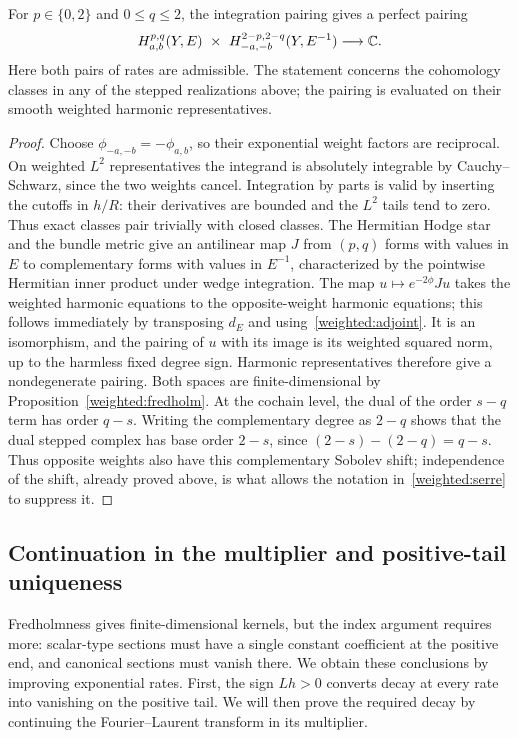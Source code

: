 \begin{lemma}\label{weighted:duality}
For $p\in\{0,2\}$ and $0\leq q\leq2$, the integration pairing gives
a perfect pairing
\begin{equation}\label{weighted:serre}
 H^{p,q}_{a,b}(Y,E)\ \times\
 H^{2-p,2-q}_{-a,-b}(Y,E^{-1})\longrightarrow\mathbb C.
\end{equation}
Here both pairs of rates are admissible. The statement concerns the
cohomology classes in any of the stepped realizations above; the pairing
is evaluated on their smooth weighted harmonic representatives.
\end{lemma}

\begin{proof}
Choose $\phi_{-a,-b}=-\phi_{a,b}$, so their exponential weight factors
are reciprocal. On weighted $L^2$
representatives the integrand is absolutely
integrable by Cauchy--Schwarz, since the two weights cancel. Integration
by parts is valid by inserting the cutoffs in $h/R$: their derivatives
are bounded and the $L^2$ tails tend to zero. Thus exact classes pair
trivially with closed classes. The Hermitian Hodge star and the bundle
metric give an antilinear map $J$ from $(p,q)$ forms with values in $E$
to complementary forms with values in $E^{-1}$, characterized by the
pointwise Hermitian inner product under wedge integration. The map
$u\mapsto e^{-2\phi}Ju$ takes the weighted harmonic equations to the
opposite-weight harmonic equations; this follows immediately by
transposing $d_E$ and using~\eqref{weighted:adjoint}. It is an
isomorphism, and the pairing of $u$ with its image is its weighted
squared norm, up to the harmless fixed degree sign. Harmonic
representatives therefore give a nondegenerate pairing. Both spaces
are finite-dimensional by Proposition~\ref{weighted:fredholm}.
At the cochain level, the dual of the order $s-q$ term has order $q-s$.
Writing the complementary degree as $2-q$ shows that the dual stepped
complex has base order $2-s$, since
$(2-s)-(2-q)=q-s$. Thus opposite weights also have this complementary
Sobolev shift; independence of the shift, already proved above, is what
allows the notation in~\eqref{weighted:serre} to suppress it.
\end{proof}

\subsection{Continuation in the multiplier and positive-tail uniqueness}

Fredholmness gives finite-dimensional kernels, but the index argument
requires more: scalar-type sections must have a single constant
coefficient at the positive end, and canonical sections must vanish
there. We obtain these conclusions by improving exponential rates.
First, the sign $Lh>0$ converts decay at every rate into vanishing on
the positive tail. We will then prove the required decay by continuing
the Fourier--Laurent transform in its multiplier.

